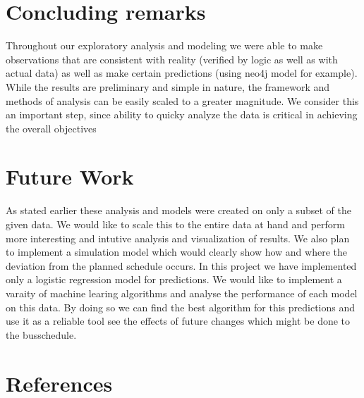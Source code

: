 \documentclass[12pt]{article}\usepackage[]{graphicx}\usepackage[]{color}
\begin{document}
\section{Concluding remarks}
Throughout our exploratory analysis and modeling we were able to make observations that are consistent with reality (verified by logic as well as with actual data) as well as make certain predictions (using neo4j model for example). While the results are preliminary and simple in nature, the framework and methods of analysis can be easily scaled to a greater magnitude. We consider this an important step, since ability to quicky analyze the data is critical in achieving the overall objectives
\section{Future Work}
As stated earlier these analysis and models were created on only a subset of the given data. We would like to scale this to the entire data at hand and perform  more interesting and intutive analysis and visualization of results. We also plan to implement a simulation model which would clearly show how and where the deviation from the planned schedule occurs. In this project we have implemented only a logistic regression model for predictions. We would like to implement a varaity of machine learing algorithms and analyse the performance of each model on this data. By doing so we can find the best algorithm for this predictions and use it as a reliable tool see the effects of future changes which might be done to the busschedule.   

\section{References}
 
	
\end{document}
